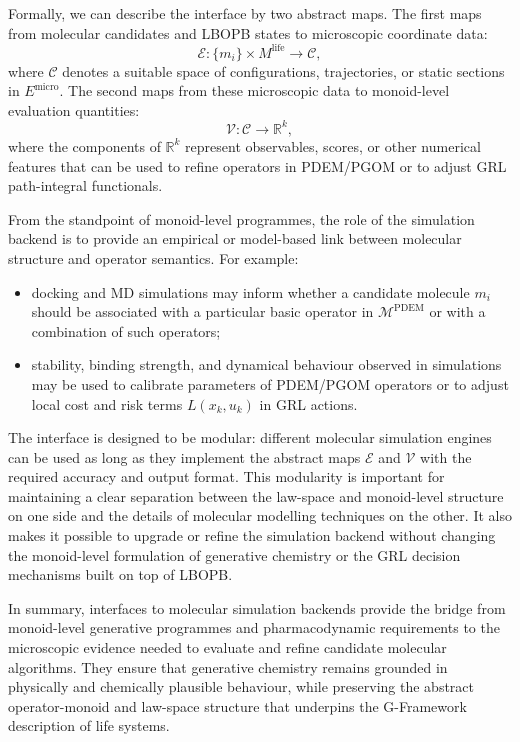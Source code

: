 \documentclass[11pt]{book}
\theoremstyle{plain}
\theoremstyle{definition}
\theoremstyle{remark}
\begin{document}
Formally, we can describe the interface by two abstract maps. The first
maps from molecular candidates and LBOPB states to microscopic
coordinate data:
\[
  \mathcal{E} \colon \{m_{i}\} \times M^{\mathrm{life}}
  \longrightarrow \mathcal{C},
\]
where $\mathcal{C}$ denotes a suitable space of configurations,
trajectories, or static sections in $E^{\mathrm{micro}}$. The second
maps from these microscopic data to monoid-level evaluation quantities:
\[
  \mathcal{V} \colon \mathcal{C}
  \longrightarrow \mathbb{R}^{k},
\]
where the components of $\mathbb{R}^{k}$ represent observables,
scores, or other numerical features that can be used to refine
operators in PDEM/PGOM or to adjust GRL path-integral functionals.

From the standpoint of monoid-level programmes, the role of the
simulation backend is to provide an empirical or model-based link
between molecular structure and operator semantics. For example:
\begin{itemize}
  \item docking and MD simulations may inform whether a candidate
        molecule $m_{i}$ should be associated with a particular
        basic operator in $\mathcal{M}^{\mathrm{PDEM}}$ or with a
        combination of such operators;
  \item stability, binding strength, and dynamical behaviour observed
        in simulations may be used to calibrate parameters of
        PDEM/PGOM operators or to adjust local cost and risk terms
        $L(x_{k}, u_{k})$ in GRL actions.
\end{itemize}

The interface is designed to be modular: different molecular simulation
engines can be used as long as they implement the abstract maps
$\mathcal{E}$ and $\mathcal{V}$ with the required accuracy and output
format. This modularity is important for maintaining a clear separation
between the law-space and monoid-level structure on one side and the
details of molecular modelling techniques on the other. It also makes
it possible to upgrade or refine the simulation backend without
changing the monoid-level formulation of generative chemistry or the
GRL decision mechanisms built on top of LBOPB.

In summary, interfaces to molecular simulation backends provide the
bridge from monoid-level generative programmes and pharmacodynamic
requirements to the microscopic evidence needed to evaluate and refine
candidate molecular algorithms. They ensure that generative chemistry
remains grounded in physically and chemically plausible behaviour,
while preserving the abstract operator-monoid and law-space structure
that underpins the G-Framework description of life systems.
\end{document}
